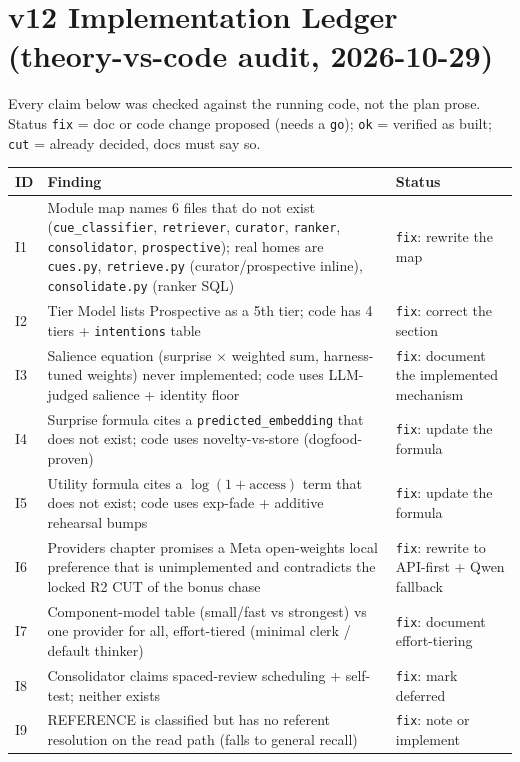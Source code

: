 \section{v12 Implementation Ledger (theory-vs-code audit, 2026-10-29)}
Every claim below was checked against the running code, not the plan prose.
Status \texttt{fix} = doc or code change proposed (needs a \texttt{go});
\texttt{ok} = verified as built; \texttt{cut} = already decided, docs must say so.
\begin{longtable}{@{}p{}p{}p{}@{}}
\toprule
ID & Finding & Status \\
\midrule
I1 & Module map names 6 files that do not exist
(\texttt{cue\_classifier}, \texttt{retriever}, \texttt{curator},
\texttt{ranker}, \texttt{consolidator}, \texttt{prospective}); real homes
are \texttt{cues.py}, \texttt{retrieve.py} (curator/prospective inline),
\texttt{consolidate.py} (ranker SQL) & \texttt{fix}: rewrite the map \\
I2 & Tier Model lists Prospective as a 5th tier; code has 4 tiers +
\texttt{intentions} table & \texttt{fix}: correct the section \\
I3 & Salience equation (surprise $\times$ weighted sum, harness-tuned
weights) never implemented; code uses LLM-judged salience + identity
floor & \texttt{fix}: document the implemented mechanism \\
I4 & Surprise formula cites a \texttt{predicted\_embedding} that does not
exist; code uses novelty-vs-store (dogfood-proven) & \texttt{fix}: update
the formula \\
I5 & Utility formula cites a $\log(1+\mathrm{access})$ term that does not
exist; code uses exp-fade + additive rehearsal bumps & \texttt{fix}:
update the formula \\
I6 & Providers chapter promises a Meta open-weights local preference that
is unimplemented and contradicts the locked R2 CUT of the bonus chase &
\texttt{fix}: rewrite to API-first + Qwen fallback \\
I7 & Component-model table (small/fast vs strongest) vs one provider for
all, effort-tiered (minimal clerk / default thinker) & \texttt{fix}:
document effort-tiering \\
I8 & Consolidator claims spaced-review scheduling + self-test; neither
exists & \texttt{fix}: mark deferred \\
I9 & REFERENCE is classified but has no referent resolution on the read
path (falls to general recall) & \texttt{fix}: note or implement \\

\end{longtable}
